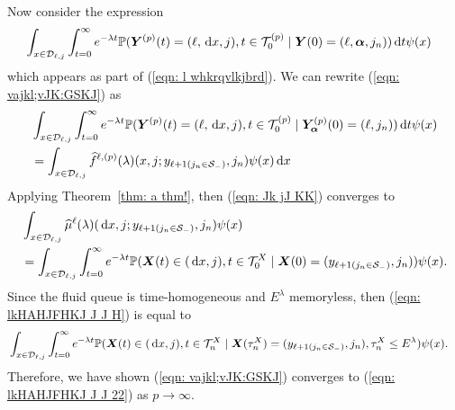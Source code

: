 Now consider the expression 
\begin{align}
	&\int_{x\in\mathcal{D}_{\ell,j}} \int_{t=0}^\infty e^{-\lambda t} \mathbb P({\boldsymbol Y}^{(p)}(t) = (\ell,\, \mathrm{d} x, j),  
	t\in\mathcal T_0^{(p)} \mid \boldsymbol Y(0) = (\ell,\boldsymbol\alpha, j_n)
	 	 )\, \mathrm{d} t  \psi(x)  \label{eqn: vajkl;vJK:GSKJ}
\end{align}
which appears as part of (\ref{eqn: l whkrqvlkjbrd}). We can rewrite (\ref{eqn: vajkl;vJK:GSKJ}) as  
\begin{align}
	 &\int_{x\in\mathcal{D}_{\ell,j}} \int_{t=0}^\infty e^{-\lambda t} \mathbb P({\boldsymbol Y}^{(p)}(t) = (\ell,\, \mathrm{d} x,j), 
	t\in\mathcal T_0^{(p)}\mid \bm{Y}_{\bm{\alpha}}^{(p)}(0) = (\ell,j_n))\, \mathrm{d} t \psi(x) \nonumber 
	 \\&= \int_{x\in\mathcal{D}_{\ell,j}} \widehat f^{\ell,(p)} (\lambda)(x,j;y_{\ell+1(j_n\in\mathcal S_-)},j_n) \psi(x)\, \mathrm{d} x \label{eqn: Jk jJ KK}
\end{align}
Applying Theorem~\ref{thm: a thm!}, then (\ref{eqn: Jk jJ KK}) converges to 
\begin{align}
	&\int_{x\in\mathcal{D}_{\ell,j}} \widehat \mu^{\ell} (\lambda)(\, \mathrm{d} x,j;y_{\ell+1(j_n\in\mathcal S_-)},j_n) \psi(x) \nonumber 
	\\&= \int_{x\in\mathcal{D}_{\ell,j}} \int_{t=0}^\infty e^{-\lambda t}\mathbb P(\boldsymbol X(t)\in(\, \mathrm{d} x, j), t\in\mathcal T_0^X \mid \boldsymbol X(0) = (y_{\ell+1(j_n\in\mathcal S_-)}, j_n) ) \psi(x). \label{eqn: lkHAHJFHKJ J J H}
\end{align}
Since the fluid queue is time-homogeneous and \(E^\lambda\) memoryless, then (\ref{eqn: lkHAHJFHKJ J J H}) is equal to 
\begin{align}
	&\int_{x\in\mathcal{D}_{\ell,j}} \int_{t=0}^\infty e^{-\lambda t} \mathbb P(\boldsymbol X(t)\in(\, \mathrm{d} x,j), t\in\mathcal T_n^{X} \mid  
	\boldsymbol X(\tau_n^X) = (y_{\ell+1(j_n\in\mathcal S_-)},j_n), \tau_n^X\leq E^\lambda ) \psi(x).  \label{eqn: lkHAHJFHKJ J J 22}
\end{align}
Therefore, we have shown (\ref{eqn: vajkl;vJK:GSKJ}) converges to (\ref{eqn: lkHAHJFHKJ J J 22}) as \(p\to\infty\). 

